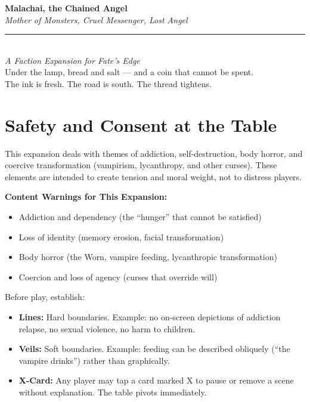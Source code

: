 \documentclass[10pt,twoside]{book}
\begin{document}
\titlepage
\begin{center}
\vspace*{2cm}
{\huge\bfseries\color{threadRed} Malachai, the Chained Angel}\\[0.8cm]
{\Large\itshape Mother of Monsters, Cruel Messenger, Lost Angel}\\[1.5cm]
\rule{0.6\textwidth}{1pt}\\[0.5cm]
\emph{A Faction Expansion for Fate's Edge}\\[1cm]
\vfill
{\small \textcolor{chainGrey}{Under the lamp, bread and salt --- and a coin that cannot be spent.}}\\[0.2cm]
{\small \textcolor{chainGrey}{The ink is fresh. The road is south. The thread tightens.}}
\end{center}
\newpage

\chapter*{Safety and Consent at the Table}

This expansion deals with themes of addiction, self-destruction, body horror, and coercive transformation (vampirism, lycanthropy, and other curses). These elements are intended to create tension and moral weight, not to distress players.

\begin{warning}
\textbf{Content Warnings for This Expansion:}
\begin{itemize}
\item Addiction and dependency (the ``hunger'' that cannot be satisfied)
\item Loss of identity (memory erosion, facial transformation)
\item Body horror (the Worn, vampire feeding, lycanthropic transformation)
\item Coercion and loss of agency (curses that override will)
\end{itemize}
\end{warning}

Before play, establish:
\begin{itemize}
\item \textbf{Lines:} Hard boundaries. Example: no on-screen depictions of addiction relapse, no sexual violence, no harm to children.
\item \textbf{Veils:} Soft boundaries. Example: feeding can be described obliquely (``the vampire drinks'') rather than graphically.
\item \textbf{X-Card:} Any player may tap a card marked X to pause or remove a scene without explanation. The table pivots immediately.
\end{itemize}
\end{document}
